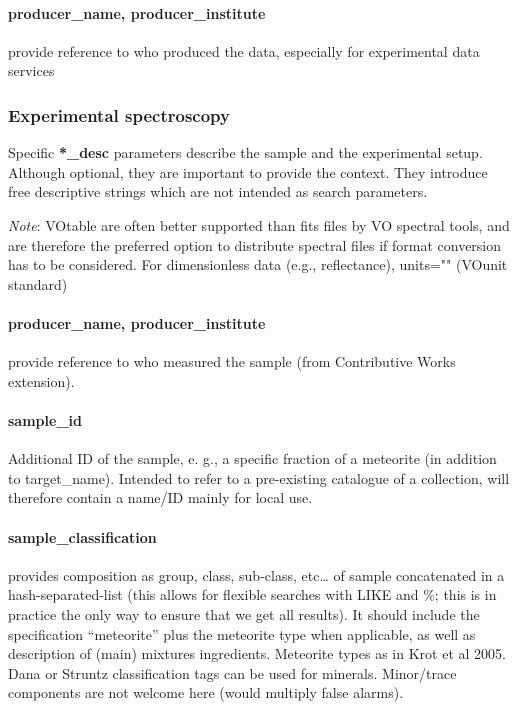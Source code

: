 \documentclass[11pt,a4paper]{ivoa}
\begin{document}
\paragraph{producer\_name, producer\_institute\\}

provide reference to who produced the data, especially for experimental data services

\subsubsection{Experimental spectroscopy}

Specific \textbf{*\_desc} parameters describe the sample and the experimental setup. Although optional, they are important to provide the context. They introduce free descriptive strings which are not intended as search parameters.

\emph{Note}: VOtable are often better supported than fits files by VO spectral tools, and are therefore the preferred option to distribute spectral files if format conversion has to be considered. For dimensionless data (e.g., reflectance), units="" (VOunit standard)

\paragraph{producer\_name, producer\_institute}

provide reference to who measured the sample (from Contributive Works extension).

\paragraph{sample\_id}

Additional ID of the sample, e. g., a specific fraction of a meteorite (in addition to target\_name). Intended to refer to a pre-existing catalogue of a collection, will therefore contain a name/ID mainly for local use. 

\paragraph{sample\_classification}

provides composition as group, class, sub-class, etc… of sample concatenated in a hash-separated-list (this allows for flexible searches with LIKE and \%; this is in practice the only way to ensure that we get all results). It should include the specification ``meteorite'' plus the meteorite type when applicable, as well as description of (main) mixtures ingredients. Meteorite types as in Krot et al 2005. Dana or Struntz classification tags can be used for minerals. Minor/trace components are not welcome here (would multiply false alarms).
\end{document}
